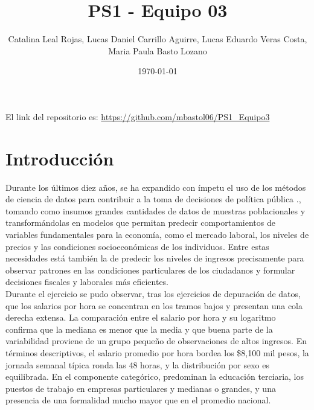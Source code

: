 \documentclass[12pt,a4paper,onecolumn]{article}
\title{PS1 - Equipo 03}
\author{Catalina Leal Rojas, Lucas Daniel Carrillo Aguirre, Lucas Eduardo Veras Costa, Maria Paula Basto Lozano}
\date{\today}
\begin{document}
\maketitle

\thispagestyle{empty} %

%

El link del repositorio es: \url{https://github.com/mbastol06/PS1_Equipo3}





\section{Introducción} \label{sec:intro}

Durante los últimos diez años, se ha expandido con ímpetu el uso de los métodos de ciencia de datos para contribuir a la toma de decisiones de política pública \citep{hossin2023bigdata,berkeley2024bigdata}., tomando como insumos grandes cantidades de datos de muestras poblacionales y transformándolas en modelos que permitan predecir comportamientos de variables fundamentales para la economía, como el mercado laboral, los niveles de precios y las condiciones socioeconómicas de los individuos. Entre estas necesidades está también la de predecir los niveles de ingresos precisamente para observar patrones en las condiciones particulares de los ciudadanos y formular decisiones fiscales y laborales más eficientes.\\


Durante el ejercicio se pudo observar, tras los ejercicios de depuración de datos, que los salarios por hora se concentran en los tramos bajos y presentan una cola derecha extensa. La comparación entre el salario por hora y su logaritmo confirma que la mediana es menor que la media y que buena parte de la variabilidad proviene de un grupo pequeño de observaciones de altos ingresos. En términos descriptivos, el salario promedio por hora bordea los \$8,100 mil pesos, la jornada semanal típica ronda las 48 horas, y la distribución por sexo es equilibrada. En el componente categórico, predominan la educación terciaria, los puestos de trabajo en empresas particulares y medianas o grandes, y una presencia de una formalidad mucho mayor que en el promedio nacional.\\ 
\end{document}
